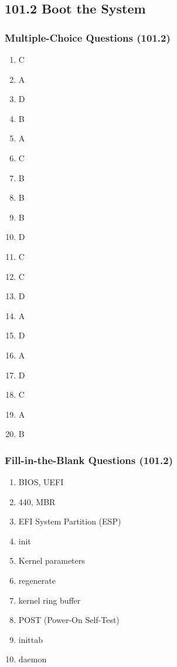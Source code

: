 \documentclass[a4paper]{report}
\begin{document}


    \subsection*{101.2 Boot the System}
    \subsubsection*{Multiple-Choice Questions (101.2)}
\begin{enumerate}[1.]
    \item C
    \item A
    \item D
    \item B
    \item A
    \item C
    \item B
    \item B
    \item B
    \item D
    \item C
    \item C
    \item D
    \item A
    \item D
    \item A
    \item D
    \item C
    \item A
    \item B
    \end{enumerate}


\subsubsection*{Fill-in-the-Blank Questions (101.2)}
\begin{enumerate}[1.]
    \item BIOS, UEFI
    \item 440, MBR
    \item EFI System Partition (ESP)
    \item init
    \item Kernel parameters
    \item regenerate
    \item kernel ring buffer
    \item POST (Power-On Self-Test)
    \item inittab
    \item daemon
    \end{enumerate}
\end{document}
